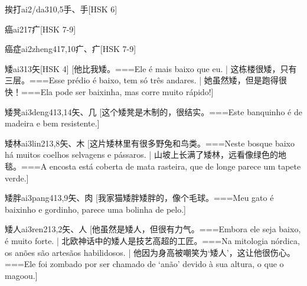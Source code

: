 \begin{EntryWithPhonetic}{挨打}{ai2/da3}{10,5}{⼿、⼿}[HSK 6]
\end{EntryWithPhonetic}

\begin{EntryWithPhonetic}{癌}{ai2}{17}{⽧}[HSK 7-9]
\end{EntryWithPhonetic}

\begin{EntryWithPhonetic}{癌症}{ai2zheng4}{17,10}{⽧、⽧}[HSK 7-9]
\end{EntryWithPhonetic}

\begin{EntryWithPhonetic}{矮}{ai3}{13}{⽮}[HSK 4]
  [他比我矮。===Ele é mais baixo que eu. | 这栋楼很矮，只有三层。===Esse prédio é baixo, tem só três andares. | 她虽然矮，但是跑得很快！===Ela pode ser baixinha, mas corre muito rápido!]
\end{EntryWithPhonetic}

\begin{EntryWithPhonetic}{矮凳}{ai3deng4}{13,14}{⽮、⼏}
  [这个矮凳是木制的，很结实。===Este banquinho é de madeira e bem resistente.]
\end{EntryWithPhonetic}

\begin{EntryWithPhonetic}{矮林}{ai3lin2}{13,8}{⽮、⽊}
  [这片矮林里有很多野兔和鸟类。===Neste bosque baixo há muitos coelhos selvagens e pássaros. | 山坡上长满了矮林，远看像绿色的地毯。===A encosta está coberta de mata rasteira, que de longe parece um tapete verde.]
\end{EntryWithPhonetic}

\begin{EntryWithPhonetic}{矮胖}{ai3pang4}{13,9}{⽮、⾁}
  [我家猫矮胖矮胖的，像个毛球。===Meu gato é baixinho e gordinho, parece uma bolinha de pelo.]
\end{EntryWithPhonetic}

\begin{EntryWithPhonetic}{矮人}{ai3ren2}{13,2}{⽮、⼈}
  [他虽然是矮人，但很有力气。===Embora ele seja baixo, é muito forte. | 北欧神话中的矮人是技艺高超的工匠。===Na mitologia nórdica, os anões são artesãos habilidosos. | 他因为身高被嘲笑为‘矮人’，这让他很伤心。===Ele foi zombado por ser chamado de ‘anão’ devido à sua altura, o que o magoou.]
\end{EntryWithPhonetic}

